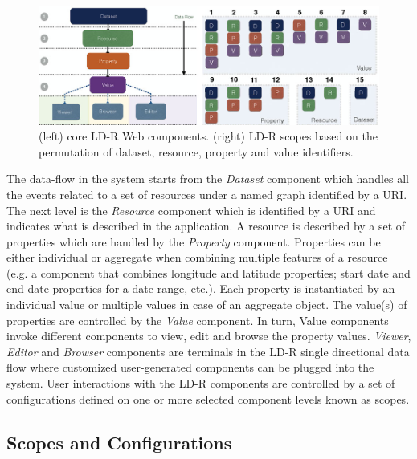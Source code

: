 \documentclass{llncs}
\begin{document}
\begin{figure}[tb]
\center
  \includegraphics[width=1\linewidth]{images/coreScopes.jpg}
  \caption{(left) core LD-R Web components. (right) LD-R scopes based on the permutation of dataset, resource, property and value identifiers.}
  \label{fig:architecture}
\end{figure}

The data-flow in the system starts from the \emph{Dataset} component which handles all the events related to a set of resources under a named graph identified by a URI.
The next level is the \emph{Resource} component which is identified by a URI and indicates what is described in the application.
A resource is described by a set of properties which are handled by the \emph{Property} component.
Properties can be either individual or aggregate when combining multiple features of a resource (e.g. a component that combines longitude and latitude properties; start date and end date properties for a date range, etc.).
Each property is instantiated by an individual value or multiple values in case of an aggregate object.
The value(s) of properties are controlled by the \emph{Value} component.
In turn, Value components invoke different components to view, edit and browse the property values.
\emph{Viewer}, \emph{Editor} and \emph{Browser} components are terminals in the LD-R single directional data flow where customized user-generated components can be plugged into the system.
User interactions with the LD-R components are controlled by a set of configurations defined on one or more selected component levels known as scopes.

\subsection{Scopes and Configurations}

\end{document}
